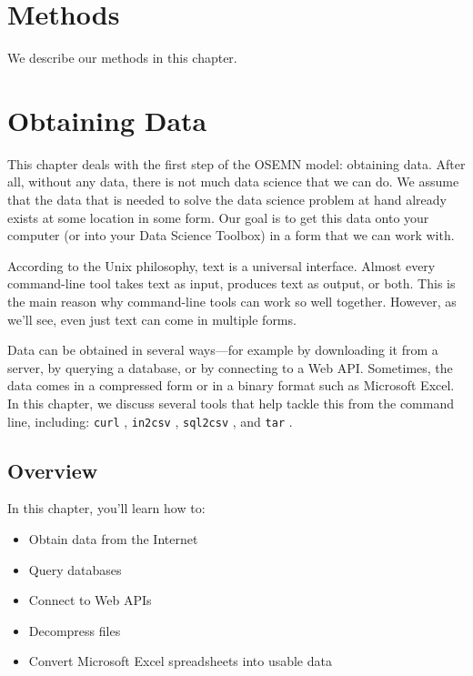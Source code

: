 \documentclass[
]{book}
\providecommand{\tightlist}{%
  \setlength{\itemsep}{0pt}\setlength{\parskip}{0pt}}
\theoremstyle{definition}
\theoremstyle{definition}
\theoremstyle{definition}
\theoremstyle{remark}
\begin{document}
\hypertarget{methods}{%
\chapter{Methods}\label{methods}}

We describe our methods in this chapter.

\hypertarget{chapter-3-obtaining-data}{%
\chapter{Obtaining Data}\label{chapter-3-obtaining-data}}

This chapter deals with the first step of the OSEMN model: obtaining data. After all, without any data, there is not much data science that we can do. We assume that the data that is needed to solve the data science problem at hand already exists at some location in some form. Our goal is to get this data onto your computer (or into your Data Science Toolbox) in a form that we can work with.

According to the Unix philosophy, text is a universal interface. Almost every command-line tool takes text as input, produces text as output, or both. This is the main reason why command-line tools can work so well together. However, as we'll see, even just text can come in multiple forms.

Data can be obtained in several ways---for example by downloading it from a server, by querying a database, or by connecting to a Web API. Sometimes, the data comes in a compressed form or in a binary format such as Microsoft Excel. In this chapter, we discuss several tools that help tackle this from the command line, including: \texttt{curl} \citep{curl}, \texttt{in2csv} \citep{in2csv}, \texttt{sql2csv} \citep{sql2csv}, and \texttt{tar} \citep{tar}.

\hypertarget{overview}{%
\section{Overview}\label{overview}}

In this chapter, you'll learn how to:

\begin{itemize}
\tightlist
\item
  Obtain data from the Internet
\item
  Query databases
\item
  Connect to Web APIs
\item
  Decompress files
\item
  Convert Microsoft Excel spreadsheets into usable data
\end{itemize}
\end{document}
